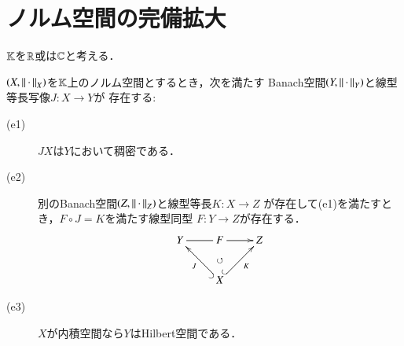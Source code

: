 \section{ノルム空間の完備拡大}
	$\mathbb{K}$を$\mathbb{R}$或は$\mathbb{C}$と考える．
	\begin{screen}
		\begin{thm}[完備拡大の存在定理]
			$(X,\left\|\, \cdot\, \right\|_{X})$を$\mathbb{K}$上のノルム空間とするとき，次を満たす
			Banach空間$(Y,\left\|\, \cdot\, \right\|_{Y})$と線型等長写像$J:X \longrightarrow Y$が
			存在する:
			\begin{description}
				\item[(e1)] $JX$は$Y$において稠密である．
				\item[(e2)] 別のBanach空間$(Z,\left\|\, \cdot\, \right\|_{Z})$と線型等長$K:X \longrightarrow Z$
					が存在して(e1)を満たすとき，$F \circ J = K$を満たす線型同型
					$F:Y \longrightarrow Z$が存在する．
					\begin{align}
						\xymatrix{
							Y \ar@{-}[r] & F \ar[r] & Z \\
							& X \ar@{^{(}->}[lu]^-J \ar@{}[u]|\circlearrowleft \ar@{^{(}->}[ru]_-K & 
						}
					\end{align}
				\item[(e3)] $X$が内積空間なら$Y$はHilbert空間である．
			\end{description}
		\end{thm}
	\end{screen}
	
